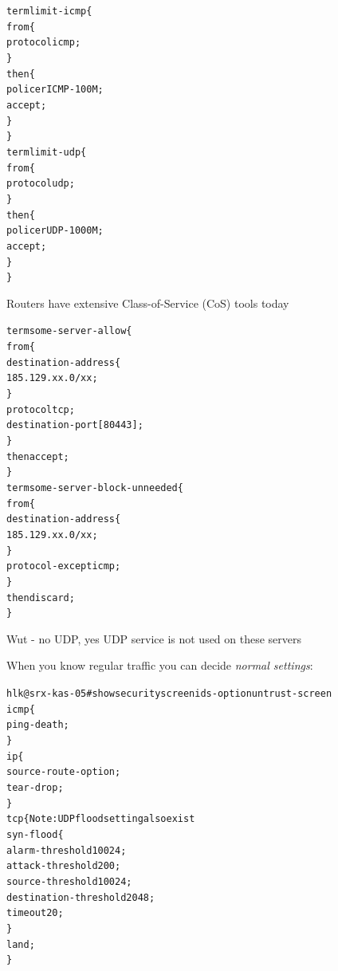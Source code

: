 \documentclass[Screen16to9,17pt]{foils}
\begin{document}

\begin{alltt}\footnotesize
term limit-icmp \{
    from \{
        protocol icmp;
    \}
    then \{
        policer ICMP-100M;
        accept;
    \}
\}
term limit-udp \{
    from \{
        protocol udp;
    \}
    then \{
        policer UDP-1000M;
        accept;
    \}
\}
\end{alltt}

Routers have extensive Class-of-Service (CoS) tools today


\begin{alltt}\footnotesize
term some-server-allow \{
    from \{
        destination-address \{
            185.129.xx.0/xx;
        \}
        protocol tcp;
        destination-port [ 80 443 ];
    \}
    then accept;
\}
term some-server-block-unneeded \{
    from \{
        destination-address \{
            185.129.xx.0/xx;
        \}
        protocol-except icmp;
    \}
    then discard;
\}
\end{alltt}

Wut - no UDP, yes UDP service is not used on these servers



When you know regular traffic you can decide \emph{normal settings}:

\begin{alltt}\footnotesize
hlk@srx-kas-05# show security screen ids-option untrust-screen
icmp \{
    ping-death;
\}
ip \{
    source-route-option;
    tear-drop;
\}
tcp \{    Note: UDP flood setting also exist
    syn-flood \{
        alarm-threshold 10024;
        attack-threshold 200;
        source-threshold 10024;
        destination-threshold 2048;
        timeout 20;
    \}
    land;
\}
\end{alltt}

\slidenext{}
\end{document}
